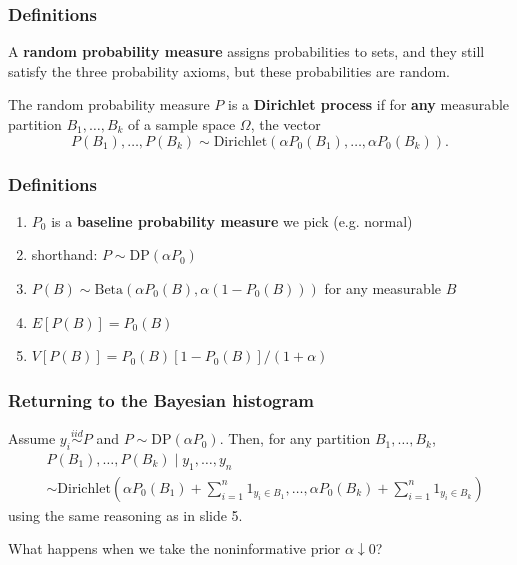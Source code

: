 \documentclass{beamer}
\begin{document}
\begin{frame}
\frametitle{Definitions}

A {\bf random probability measure} assigns probabilities to sets, and they still satisfy the three probability axioms, but these probabilities are random. 
\newline
\pause

The random probability measure $P$ is a {\bf Dirichlet process} if for {\bf any} measurable partition $B_1, \ldots, B_k$ of a sample space $\Omega$, the vector
$$
P(B_1), \ldots, P(B_k) \sim \text{Dirichlet}(\alpha P_0(B_1), \ldots, \alpha P_0(B_k)).
$$


\end{frame}
\begin{frame}
\frametitle{Definitions}


\begin{enumerate}
\item $P_0$ is a {\bf baseline probability measure} we pick (e.g. normal)
\item shorthand: $P \sim \text{DP}(\alpha P_0)$
\item $P(B) \sim \text{Beta}(\alpha P_0(B), \alpha(1-P_0(B)))$ for any measurable $B$
\item $E[P(B)] = P_0(B)$
\item $V[P(B)] = P_0(B)[1-P_0(B)]/(1+\alpha)$
\end{enumerate}

\end{frame}

\begin{frame}
\frametitle{Returning to the Bayesian histogram}

Assume $y_i \overset{iid}{\sim} P$ and $P \sim \text{DP}(\alpha P_0)$. Then, for any partition $B_1, \ldots, B_k$,  
\begin{align*}
&P(B_1), \ldots, P(B_k) \mid y_1, \ldots, y_n \\
&\sim \text{Dirichlet}\left(\alpha P_0(B_1) + \sum_{i=1}^n 1_{y_i \in B_1}, \ldots, \alpha P_0(B_k) + \sum_{i=1}^n 1_{y_i \in B_k} \right)
\end{align*}
using the same reasoning as in slide 5.
\newline
\pause

What happens when we take the noninformative prior $\alpha \downarrow 0$?

\end{frame}
\end{document}
